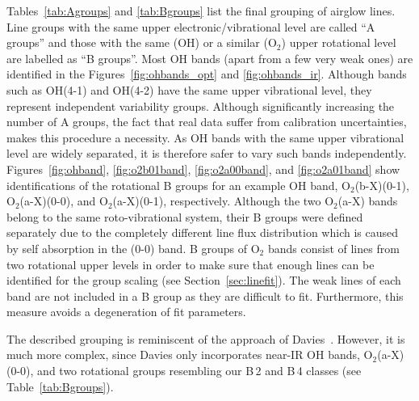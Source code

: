 Tables~\ref{tab:Agroups} and \ref{tab:Bgroups} list the final grouping of
airglow lines. Line groups with the same upper electronic/vibrational level are
called ``A groups'' and those with the same (OH) or a similar (O$_2$) upper
rotational level are labelled as ``B groups''. Most OH bands (apart from a
few very weak ones) are identified in the Figures~\ref{fig:ohbands_opt} and
\ref{fig:ohbands_ir}. Although bands such as OH(4-1) and OH(4-2) have the same
upper vibrational level, they represent independent variability groups.
Although significantly increasing the number of A groups, the fact that real
data suffer from calibration uncertainties, makes this procedure a necessity.
As OH bands with the same upper vibrational level are widely separated, it is
therefore safer to vary such bands independently. Figures~\ref{fig:ohband},
\ref{fig:o2b01band}, \ref{fig:o2a00band}, and \ref{fig:o2a01band} show
identifications of the rotational B groups for an example OH band,
O$_2$(b-X)(0-1), O$_2$(a-X)(0-0), and O$_2$(a-X)(0-1), respectively. Although
the two O$_2$(a-X) bands belong to the same roto-vibrational system, their
B groups were defined separately due to the completely different line flux
distribution which is caused by self absorption in the (0-0) band. B groups of
O$_2$ bands consist of lines from two rotational upper levels in order to
make sure that enough lines can be identified for the group scaling (see
Section~\ref{sec:linefit}). The weak lines of each band are not included in a B
group as they are difficult to fit. Furthermore, this measure avoids a
degeneration of fit parameters.

The described grouping is reminiscent of the approach of Davies~\cite{DAV07}.
However, it is much more complex, since Davies only incorporates near-IR OH
bands, O$_2$(a-X)(0-0), and two rotational groups resembling our B\,2 and B\,4
classes (see Table~\ref{tab:Bgroups}).

